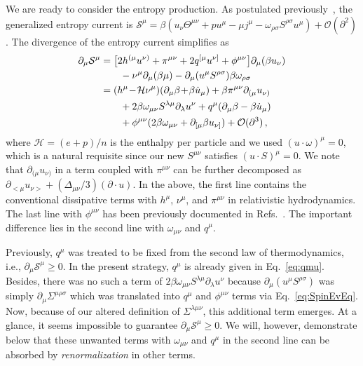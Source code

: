 \documentclass[prl,superscriptaddress,twocolumn,
  showpacs,preprintnumbers,amsmath,amssymb]{revtex4-1}
\begin{document}
We are ready to consider the entropy production.  As postulated previously~\citep{Fukushima:2020ucl}, the generalized entropy current is $\mathcal{S}^{\mu}=\beta ( u_{\nu}\Theta^{\mu\nu}+pu^{\mu}-\mu j^{\mu}-\omega_{\rho\sigma}S^{\rho\sigma}u^{\mu} ) + \mathcal{O}(\partial^2)$.  The divergence of the entropy current simplifies as
\begin{align}
  \partial_\mu \mathcal{S}^\mu
  &= \bigl[ 2h^{(\mu} u^{\nu)} + \pi^{\mu\nu} + 2q^{[\mu} u^{\nu]}
    + \phi^{\mu\nu} \bigr]\partial_\mu (\beta u_\nu) \notag\\
  &\qquad - \nu^\mu \partial_\mu (\beta\mu)
    -\partial_\mu (u^\mu S^{\rho\sigma}) \beta\omega_{\rho\sigma} \notag\\
  &= (h^\mu \!-\! \mathcal{H}\nu^\mu) (\partial_\mu\beta \!+\! \beta \dot{u}_\mu)
    + \beta \pi^{\mu\nu}

    \partial_{(\mu} u_{\nu)}\notag\\
  &\qquad + 2\beta \omega_{\mu\nu} S^{\lambda\mu} \partial_\lambda u^\nu

  + q^\mu (\partial_\mu\beta - \beta \dot{u}_\mu)
     \notag\\
  &\qquad + \phi^{\mu\nu} (2\beta\omega_{\mu\nu} + \partial_{[\mu} \beta u_{\nu]} )
    + \mathcal{O}(\partial^3) \,,
    \label{eq:divS}
\end{align}
where $\mathcal{H}=(e+p)/n$ is the enthalpy per particle and we used $(u\cdot \omega)^\mu=0$, which is a natural requisite since our new $S^{\mu\nu}$ satisfies $(u\cdot S)^\mu=0$.
We note that $\partial_{(\mu}u_{\nu)}$ in a term coupled with $\pi^{\mu\nu}$ can be further decomposed as $\partial_{<\mu} u_{\nu>} + (\Delta_{\mu\nu}/3)(\partial\cdot u)$.
In the above, the first line contains the conventional dissipative terms with $h^\mu$, $\nu^\mu$, and $\pi^{\mu\nu}$ in relativistic hydrodynamics.  The last line with $\phi^{\mu\nu}$ has been previously documented in Refs.~\cite{Hattori:2019lfp,Fukushima:2020ucl}.
The important difference lies in the second line with $\omega_{\mu\nu}$ and $q^\mu$.

Previously, $q^\mu$ was treated to be fixed from the second law of thermodynamics, i.e., $\partial_\mu \mathcal{S}^\mu \geq 0$.  In the present strategy, $q^\mu$ is already given in Eq.~\eqref{eq:qmu}.  Besides, there was no such a term of $2\beta\omega_{\mu\nu} S^{\lambda\mu}\partial_\lambda u^\nu$ because $\partial_\mu(u^\mu S^{\rho\sigma})$ was simply $\partial_\mu \Sigma^{\mu\rho\sigma}$ which was translated into $q^\mu$ and $\phi^{\mu\nu}$ terms via Eq.~\eqref{eq:SpinEvEq}.  Now, because of our altered definition of $\Sigma^{\lambda\mu\nu}$, this additional term emerges.  At a glance, it seems impossible to guarantee $\partial_\mu \mathcal{S}^\mu \geq 0$.  We will, however, demonstrate below that these unwanted terms with $\omega_{\mu\nu}$ and $q^\mu$ in the second line can be absorbed by \textit{renormalization} in other terms.
\end{document}

